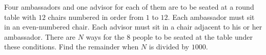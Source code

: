 Four ambassadors and one advisor for each of them are to be seated at a round table with $12$ chairs numbered in order from $1$ to $12$. Each ambassador must sit in an even-numbered chair. Each advisor must sit in a chair adjacent to his or her ambassador. There are $N$ ways for the $8$ people to be seated at the table under these conditions. Find the remainder when $N$ is divided by $1000$.